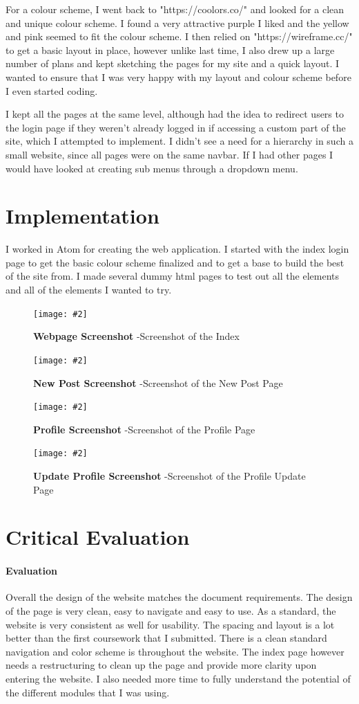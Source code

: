 \documentclass[10pt, a4paper]{article}
\newcommand{\figuremacro}[5]{
    \begin{figure}[#1]
        \centering
        \texttt{[image: \#2]}
        \caption[#3]{\textbf{#3}#4}
        \label{fig:#2}
    \end{figure}
}
\begin{document}
For a colour scheme, I went back to "https://coolors.co/" and looked for a clean and unique colour scheme. I found a very attractive purple I liked and the yellow and pink seemed to fit the colour scheme. I then relied on "https://wireframe.cc/" to get a basic layout in place, however unlike last time, I also drew up a large number of plans and kept sketching the pages for my site and a quick layout. I wanted to ensure that I was very happy with my layout and colour scheme before I even started coding.

I kept all the pages at the same level, although had the idea to redirect users to the login page if they weren't already logged in if accessing a custom part of the site, which I attempted to implement. I didn't see a need for a hierarchy in such a small website, since all pages were on the same navbar. If I had other pages I would have looked at creating sub menus through a dropdown menu.

	\section{Implementation}
I worked in Atom for creating the web application. I started with the index login page to get the basic colour scheme finalized and to get a base to build the best of the site from.
I made several dummy html pages to test out all the elements and all of the elements I wanted to try.
\cite{profile}\cite{jquery}\cite{express}\cite{nodejs}

	\figuremacro{h}{index-screenshot}{Webpage Screenshot}{ -Screenshot of the Index}{1.0}
	\figuremacro{h}{new-post-screenshot}{New Post Screenshot}{ -Screenshot of the New Post Page}{1.0}
	\figuremacro{h}{profile-screenshot}{Profile Screenshot}{ -Screenshot of the Profile Page}{1.0}
	\figuremacro{h}{update-profile-screenshot}{Update Profile Screenshot}{ -Screenshot of the Profile Update Page}{1.0}
	
	\section{Critical Evaluation}
	\paragraph{Evaluation}
Overall the design of the website matches the document requirements. The design of the page is very clean, easy to navigate and easy to use. As a standard, the website is very consistent as well for usability. The spacing and layout is a lot better than the first coursework that I submitted.
There is a clean standard navigation and color scheme is throughout the website.
The index page however needs a restructuring to clean up the page and provide more clarity upon entering the website.
I also needed more time to fully understand the potential of the different modules that I was using.
\end{document}
